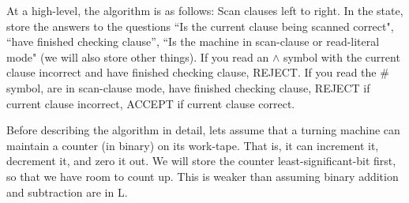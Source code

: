 \documentclass[12pt]{article}
\begin{document}
\begin{solution}



    At a high-level, the algorithm is as follows: \bbni 
    Scan clauses left to right. In the state, store the answers to the questions ``Is the current clause being scanned correct", ``have finished checking clause'', ``Is the machine in scan-clause or read-literal mode" (we will also store other things). If you read an $\land$ symbol with the current clause incorrect and have finished checking clause, REJECT. If you read the \# symbol, are in scan-clause mode, have finished checking clause, REJECT if current clause incorrect, ACCEPT if current clause correct. \bbni 

    Before describing the algorithm in detail, lets assume that a turning machine can maintain a counter (in binary) on its work-tape. That is, it can increment it, decrement it, and zero it out. We will store the counter least-significant-bit first, so that we have room to count up. This is weaker than assuming binary addition and subtraction are in L. \bbni


\end{solution}
\end{document}
